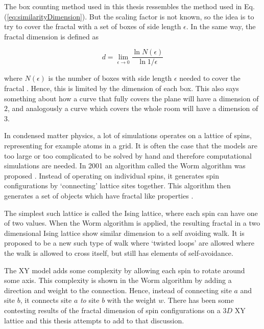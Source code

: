 The box counting method used in this thesis ressembles the method used in Eq. (\ref{eq:similarityDimension}). But the scaling factor is not known, so the idea is to try to cover the fractal with a set of boxes of side length $\epsilon$. In the same way, the fractal dimension is defined as 

\begin{equation}
    d = \lim_{\epsilon \to 0} \frac{\ln N(\epsilon)}{\ln 1 / \epsilon}
\end{equation}

\noindent where $N(\epsilon)$ is the number of boxes with side length $\epsilon$ needed to cover the fractal \cite{strogatz:dynamics_chaos}. Hence, this is limited by the dimension of each box. This also says something about how a curve that fully covers the plane will have a dimension of $2$, and analogously a curve which covers the whole room will have a dimension of $3$.

In condensed matter physics, a lot of simulations operates on a lattice of spins, representing for example atoms in a grid. It is often the case that the models are too large or too complicated to be solved by hand and therefore computational simulations are needed. In 2001 an algorithm called the Worm algorithm was proposed \cite{Prokofev:first_worm_algorithm}. Instead of operating on individual spins, it generates spin configurations by `connecting' lattice sites together. This algorithm then generates a set of objects which have fractal like properties \cite{Duplantier:GeoHausdorff}. 

The simplest such lattice is called the Ising lattice, where each spin can have one of two values. When the Worm algorithm is applied, the resulting fractal in a two dimensional Ising lattice show similar dimension to a self avoiding walk. It is proposed to be a new such type of walk where `twisted loops' are allowed where the walk is allowed to cross itself, but still has elements of self-avoidance.

The XY model adds some complexity by allowing each spin to rotate around some axis. This complexity is shown in the Worm algorithm by adding a direction and weight to the connection. Hence, instead of connecting site $a$ and site $b$, it connects site $a$ \textit{to} site $b$ with the weight $w$. There has been some contesting results of the fractal dimension of spin configurations on a $3D$ XY lattice \cite{Prokofev:comment_on_hove_hausdorff_crit_fluct}\cite{Hove:hausdorff_crit_fluctuations} and this thesis attempts to add to that discussion. 













